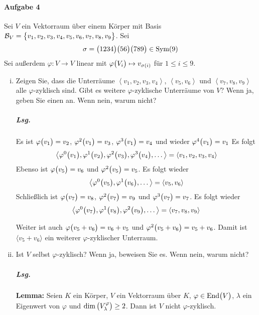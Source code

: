 \documentclass{scrreprt}
\newcommand\End{\text{End}}
\newcommand\Sym{\text{Sym}}
\begin{document}
\paragraph{Aufgabe 4} Sei $V$ ein Vektorraum über einem Körper mit Basis
$\mathcal{B}_V = \qty\big{v_1, v_2, v_3, v_4, v_5, v_6, v_7, v_8, v_9}$.
Sei
\[
  \sigma = \qty\big(1234)\qty\big(56)\qty\big(789) \in \Sym(9)
\]
Sei außerdem $\varphi \colon V \to V$ linear mit
$\varphi\qty\big(V_i) \mapsto v_{\sigma(i)}$ für $1 \leq i \leq 9$.

\begin{enumerate}[(i)]
\item Zeigen Sie, dass die Unterräume
  $\left\langle v_1, v_2, v_3, v_4\right\rangle$,
  $\left\langle v_5, v_6\right\rangle$ und
  $\left\langle v_7, v_8, v_9\right\rangle$ alle $\varphi$-zyklisch sind.
  Gibt es weitere $\varphi$-zyklische Unterräume von $V$?
  Wenn ja, geben Sie einen an.
  Wenn nein, warum nicht?

  \subparagraph{Lsg.} Es ist $\varphi\qty\big(v_1) = v_2$,
  $\varphi^2\qty\big(v_1) = v_3$, $\varphi^3\qty\big(v_1) = v_4$ und wieder
  $\varphi^4\qty\big(v_1) = v_1$
  Es folgt
  \[
    \big\langle
      \varphi^0\qty\big(v_1),
      \varphi^1\qty\big(v_2),
      \varphi^2\qty\big(v_3),
      \varphi^3\qty\big(v_4),
      \ldots
    \big\rangle = \left\langle v_1, v_2, v_3, v_4\right\rangle
  \]
  Ebenso ist $\varphi\qty\big(v_5) = v_6$ und
  $\varphi^2\qty\big(v_5) = v_5$.
  Es folgt wieder
  \[
    \big\langle
      \varphi^0\qty\big(v_5),
      \varphi^1\qty\big(v_6),
      \ldots
    \big\rangle = \left\langle v_5, v_6\right\rangle
  \]
  Schließlich ist $\varphi\qty\big(v_7) = v_8$, $\varphi^2\qty\big(v_7) = v_9$
  und $\varphi^3\qty\big(v_7) = v_7$.
  Es folgt wieder
  \[
    \big\langle
      \varphi^0\qty\big(v_7),
      \varphi^1\qty\big(v_8),
      \varphi^2\qty\big(v_9),
      \ldots
    \big\rangle = \left\langle v_7, v_8, v_9 \right\rangle
  \]

  Weiter ist auch $\varphi\qty\big(v_5 + v_6) = v_6 + v_5$ und
  $\varphi^2\qty\big(v_5 + v_6) = v_5 + v_6$.
  Damit ist $\big\langle v_5 + v_6 \big\rangle$ ein weiterer
  $\varphi$-zyklischer Unterraum.

\newpage
\item Ist $V$ selbst $\varphi$-zyklisch?
  Wenn ja, beweisen Sie es.
  Wenn nein, warum nicht?

  \subparagraph{Lsg.} \textbf{Lemma:} Seien $K$ ein Körper, $V$ ein Vektorraum
  über $K$, $\varphi \in \End\qty\big(V)$, $\lambda$ ein Eigenwert von
  $\varphi$ und $\dim\qty\big(V_{\lambda}^{\varphi}) \geq 2$.
  Dann ist $V$ nicht $\varphi$-zyklisch.


\end{enumerate}
\end{document}
